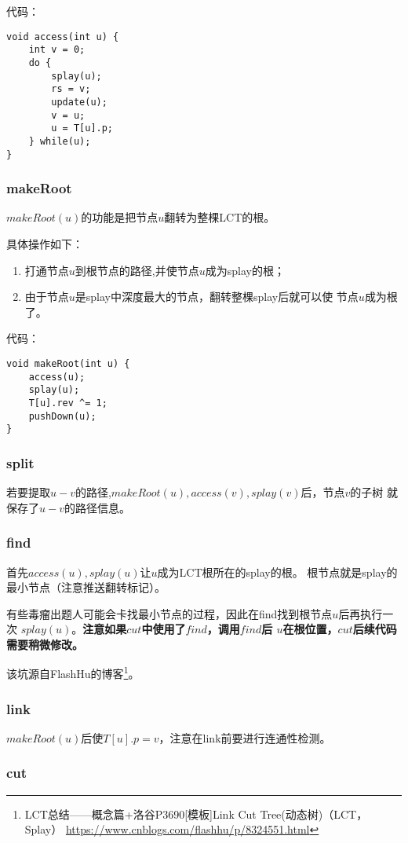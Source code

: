 代码：
\begin{lstlisting}[title=access]
void access(int u) {
    int v = 0;
    do {
        splay(u);
        rs = v;
        update(u);
        v = u;
        u = T[u].p;
    } while(u);
}
\end{lstlisting}

\subsubsection{makeRoot}
$makeRoot(u)$的功能是把节点$u$翻转为整棵LCT的根。

具体操作如下：

\begin{enumerate}
    \item 打通节点$u$到根节点的路径,并使节点$u$成为splay的根；
    \item 由于节点$u$是splay中深度最大的节点，翻转整棵splay后就可以使
    节点$u$成为根了。
\end{enumerate}

代码：

\begin{lstlisting}[title=makeRoot]
void makeRoot(int u) {
    access(u);
    splay(u);
    T[u].rev ^= 1;
    pushDown(u);
}
\end{lstlisting}
\subsubsection{split}
若要提取$u-v$的路径,$makeRoot(u),access(v),splay(v)$后，节点$v$的子树
就保存了$u-v$的路径信息。
\subsubsection{find}\label{LCTFind}
首先$access(u),splay(u)$让$u$成为LCT根所在的splay的根。
根节点就是splay的最小节点（注意推送翻转标记）。

有些毒瘤出题人可能会卡找最小节点的过程，因此在find找到根节点$u$后再执行一次
$splay(u)$。{\bfseries 注意如果$cut$中使用了$find$，调用$find$后
$u$在根位置，$cut$后续代码需要稍微修改。}

该坑源自FlashHu的博客\footnote{
    LCT总结——概念篇+洛谷P3690[模板]Link Cut Tree(动态树)（LCT，Splay）
    \url{https://www.cnblogs.com/flashhu/p/8324551.html}
}。
\subsubsection{link}
$makeRoot(u)$后使$T[u].p=v$，注意在link前要进行连通性检测。
\subsubsection{cut}

